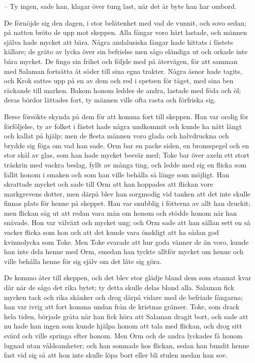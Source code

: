 – Ty ingen, sade han, klagar över tung last, när det är byte han har ombord.

\initial De förnöjde sig den dagen, i stor belåtenhet med vad de vunnit, och sovo sedan; på natten bröto de upp mot skeppen. Alla fångar voro hårt lastade, och männen själva hade mycket att bära. Några andalusiska fångar hade hittats i fästets källare; de gräto av lycka över sin befrielse men sågo eländiga ut och orkade inte bära mycket. De fingo sin frihet och följde med på återvägen, för att samman med Salaman fortsätta åt söder till sina egna trakter. Några åsnor hade tagits, och Krok sattes upp på en av dem och red i spetsen för tåget, med sina ben räckande till marken. Bakom honom leddes de andra, lastade med föda och öl; deras bördor lättades fort, ty männen ville ofta rasta och förfriska sig.

\initial Berse försökte skynda på dem för att komma fort till skeppen. Han var orolig för förföljelse, ty av folket i fästet hade några undkommit och kunde ha nått långt och kallat på hjälp; men de flesta männen voro glada och halvdruckna och brydde sig föga om vad han sade. Orm bar en packe siden, en bronsspegel och en stor skål av glas, som han hade mycket besvär med; Toke bar över axeln ett stort träskrin med vackra beslag, fyllt av många ting, och ledde med sig en flicka som fallit honom i smaken och som han ville behålla så länge som möjligt. Han skrattade mycket och sade till Orm att han hoppades att flickan vore markgrevens dotter, men därpå blev han sorgmodig vid tanken att det inte skulle finnas plats för henne på skeppet. Han var snubblig i fötterna av allt han druckit; men flickan såg ut att redan vara mån om honom och stödde honom när han snävade. Hon var välväxt och mycket ung; och Orm sade att han sällan sett en så vacker flicka som hon och att det kunde vara önskligt att ha sådan god kvinnolycka som Toke. Men Toke svarade att hur goda vänner de än voro, kunde han inte dela henne med Orm, emedan han tyckte alltför mycket om henne och ville behålla henne för sig själv om det läte sig göra.

\initial De kommo åter till skeppen, och det blev stor glädje bland dem som stannat kvar där när de sågo det rika bytet; ty detta skulle delas bland alla. Salaman fick mycken tack och rika skänker och drog därpå vidare med de befriade fångarna; han var ivrig att fort komma undan från de kristnas gränser. Toke, som drack hela tiden, började gråta när han fick höra att Salaman dragit bort, och sade att nu hade han ingen som kunde hjälpa honom att tala med flickan, och drog sitt svärd och ville springa efter honom. Men Orm och de andra lyckades få honom lugnad utan våldsamheter; och han somnade hos flickan, sedan han bundit henne fast vid sig så att hon inte skulle löpa bort eller bli stulen medan han sov.

